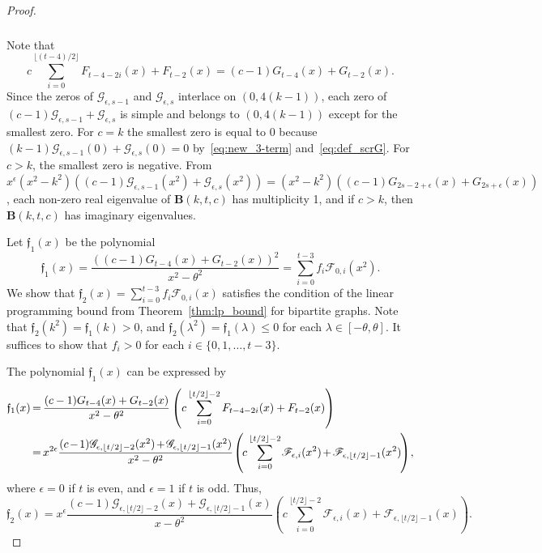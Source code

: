 \documentclass[10pt]{amsart}
\newcommand*{\Mk}{\mkern -2mu}
\begin{document}
\begin{proof}
\begin{multline*}
\begin{aligned}
\end{aligned}
\end{multline*}
Note that
\[
c\sum_{i=0}^{ \lfloor (t-4)/2 \rfloor}F_{t-4-2i}(x)+F_{t-2}(x)=(c-1){G}_{t-4}(x)+{G}_{t-2}(x). 
\]
Since the zeros of $\mathscr{G}_{\epsilon,s-1}$ and $\mathscr{G}_{\epsilon,s}$ interlace on $(0,4(k-1))$, each zero of $(c-1)\mathscr{G}_{\epsilon,s-1}+\mathscr{G}_{\epsilon,s}$ is simple and belongs to $(0,4(k-1))$ except for the smallest zero. 
For $c=k$ the smallest zero is equal to $0$ because 
$
(k-1)\mathscr{G}_{\epsilon,s-1}(0)+\mathscr{G}_{\epsilon,s}(0)=0
$ 
by~\eqref{eq:new_3-term} and~\eqref{eq:def_scrG}. 
For $c>k$, the smallest zero is negative. From $x^{\epsilon}(x^2-k^2)((c-1)\mathscr{G}_{\epsilon,s-1}(x^2)+\mathscr{G}_{\epsilon,s}(x^2))=(x^2-k^2)((c-1){G}_{2s-2+\epsilon}(x)+{G}_{2s+\epsilon}(x))$, 
each non-zero real eigenvalue of 
$\boldsymbol{B}(k,t,c)$ has multiplicity 1, 
and if $c>k$, then $\boldsymbol{B}(k,t,c)$ has 
imaginary eigenvalues. 

Let $\mathfrak{f}_1(x)$ be the polynomial 
\[
\mathfrak{f}_1(x)=\frac{((c-1){G}_{t-4}(x)+G_{t-2}(x))^2}{x^2-\theta^2}=\sum_{i=0}^{ t- 3} f_i \mathscr{F}_{0,i}(x^2).
\]
We show that $\mathfrak{f}_2(x)=\sum_{i=0}^{ t - 3} f_i \mathscr{F}_{0,i}(x)$ satisfies the condition of the linear programming bound from Theorem~\ref{thm:lp_bound} for bipartite graphs. 
Note that $\mathfrak{f}_2(k^2)=\mathfrak{f}_1(k)>0$, and $\mathfrak{f}_2(\lambda^2)=\mathfrak{f}_1(\lambda) \leq 0$ for each $\lambda \in [-\theta, \theta]$. 
It suffices to show that $f_i>0$ for each $i\in \{0,1,\ldots, t- 3\}$. 
 
The polynomial $\mathfrak{f}_1(x)$ can be expressed by 
\begin{align*}
\mathfrak{f}_1(x)&\Mk =\Mk 
\frac{(c-1){G}_{t-4}(x)+{G}_{t-2}(x)}{x^2-\theta^2}
\left(c\sum_{i=0}^{\lfloor t/2 \rfloor-2}{F}_{t-4-2i}(x)+{F}_{t-2}(x) \right)\\
&\Mk =\Mk x^{2\epsilon}
\frac{(c\Mk -\Mk 1)\mathscr{G}_{\epsilon,\lfloor t/2 \rfloor-2 }(x^2)\Mk +\Mk \mathscr{G}_{\epsilon,\lfloor t/2 \rfloor-1 }(x^2)}{x^2-\theta^2}
\Mk \left(\Mk c\sum_{i=0}^{\lfloor t/2 \rfloor-2}\Mk \mathscr{F}_{\epsilon,i}(x^2)\Mk +\Mk 
\mathscr{F}_{\epsilon,\lfloor t/2 \rfloor-1}(x^2)\Mk \right)\Mk , 
\end{align*}
where $\epsilon=0$ if $t$ is even, 
and $\epsilon=1$ if $t$ is odd. Thus, 
\[
\mathfrak{f}_2(x)=x^{\epsilon}
\frac{(c-1)\mathscr{G}_{\epsilon,\lfloor t/2 \rfloor-2 }(x)+\mathscr{G}_{\epsilon,\lfloor t/2 \rfloor-1 }(x)}{x-\theta^2}
\left(c\sum_{i=0}^{\lfloor t/2 \rfloor-2}\mathscr{F}_{\epsilon,i}(x)+
\mathscr{F}_{\epsilon,\lfloor t/2 \rfloor-1}(x)\right).
\]


\end{proof}
\end{document}
